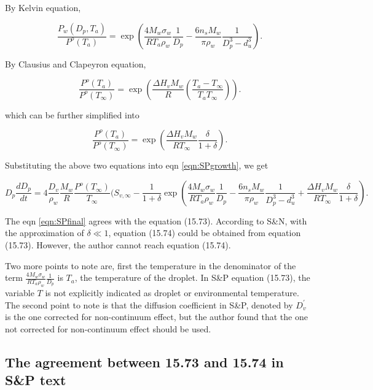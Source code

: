 \documentclass[12pt]{amsart}
\begin{document}
By Kelvin equation, 

\begin{equation}\label{eqn:kelvin}
\frac{P_{w}(D_{p}, T_{a})}{P^{o}(T_{a})}=\exp( \frac{4 M_{w}\sigma_{w}}{R T_{a} \rho_w}\frac{1}{D_{p}}-\frac{6 n_{s} M_{w}}{\pi \rho_{w}} \frac{1}{D_{p}^{3}-d_{u}^{3}}).
\end{equation}

By Clausius and Clapeyron equation,

\begin{equation}
\frac{P^{o}(T_{a})}{P^{o}(T_{\infty})}=\exp (\frac{\Delta H_{v} M_{w}}{R} (\frac{T_{a}-T_{\infty}}{T_{a} T_{\infty}})).
\end{equation}

which can be further simplified into 

\begin{equation}\label{eqn:CC}
\frac{P^{o}(T_{a})}{P^{o}(T_{\infty})}=\exp (\frac{\Delta H_{v} M_{w}}{R T_{\infty}} \frac{\delta}{1+\delta}).
\end{equation}

Substituting the above two equations into eqn \ref{eqn:SPgrowth}, we get

\begin{equation}\label{eqn:SPfinal}
D_{p}\frac{dD_{p}}{dt}=4 \frac{D_{v}} {\rho_{w}} \frac{M_{w}}{R} \frac{P^{o}(T_{\infty})} {T_{\infty}} (S_{v, \infty} - \frac{1}{1+\delta} \exp(\frac{4 M_{w}\sigma_{w}}{R T_{a} \rho_w}\frac{1}{D_{p}}-\frac{6 n_{s} M_{w}}{\pi \rho_{w}} \frac{1}{D_{p}^{3}-d_{u}^{3}}+\frac{\Delta H_{v} M_{w}}{R T_{\infty}} \frac{\delta}{1+\delta}).
\end{equation}

The eqn \ref{eqn:SPfinal} agrees with the equation (15.73). According to S\&N, with the approximation of $\delta \ll 1$, equation (15.74) could be obtained from equation (15.73).  However, the author cannot reach equation (15.74).

Two more points to note are, first the temperature in the denominator of the term  $\frac{4 M_{w}\sigma_{w}}{R T_{a} \rho_w}\frac{1}{D_{p}}$ is $T_{a}$, the temperature of the droplet. In S\&P equation (15.73), the variable $T$ is not explicitly indicated as droplet or environmental temperature. The second point to note is that the diffusion coefficient in S\&P, denoted by $D_{v}^{'}$  is the one corrected for non-continuum effect, but the author found that the one not corrected for non-continuum effect should be used.

\subsection{The agreement between 15.73 and 15.74 in S\&P text}
\end{document}
